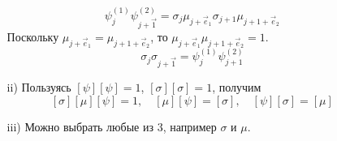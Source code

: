 \documentclass[12pt]{article}
\theoremstyle{definition}
\begin{document}
\begin{enumerate}
\begin{itemize}
\begin{equation}
        \psi^{(1)}_j\psi^{(2)}_{j+\vec{1}}=\sigma_j\mu_{j+\vec{e}_1}\sigma_{j+1}\mu_{j+1+\vec{e}_2}
    \end{equation}
    Поскольку $\mu_{j+\vec{e}_1}=\mu_{j+1+\vec{e}_2}$, то $\mu_{j+\vec{e}_1}\mu_{j+1+\vec{e}_2}=1$.
    \begin{equation}
        \boxed{\sigma_j\sigma_{j+\vec{1}}=\psi^{(1)}_j\psi^{(2)}_{j+1}}
    \end{equation}
    \item[ii)] Пользуясь $[\psi][\psi]=1$, $[\sigma][\sigma]=1$, получим
    \begin{equation}
        \boxed{[\sigma][\mu][\psi]=1,\quad[\mu][\psi]=[\sigma],\quad[\psi][\sigma]=[\mu]}
    \end{equation}
    \item[iii)] Можно выбрать любые из 3, например $\sigma$ и $\mu$.
\end{itemize}
\end{enumerate}
\end{document}
